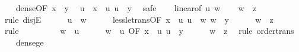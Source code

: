 \begin{isabellebody}
\ \ \isamarkupfalse%
\ dense{\isacharbrackleft}{\kern0pt}OF\ {\isacartoucheopen}x\ {\isacharless}{\kern0pt}\ y{\isacartoucheclose}{\isacharbrackright}{\kern0pt}\ \isamarkupfalse%
\ u\ \ {\isachardoublequoteopen}x\ {\isacharless}{\kern0pt}\ u{\isachardoublequoteclose}\ {\isachardoublequoteopen}u\ {\isacharless}{\kern0pt}\ y{\isachardoublequoteclose}\ \isamarkupfalse%
\ safe\isanewline
\ \ \isamarkupfalse%
\ linear{\isacharbrackleft}{\kern0pt}of\ u\ w{\isacharbrackright}{\kern0pt}\isanewline
\ \ \isamarkupfalse%
\ {\isachardoublequoteopen}w\ {\isasymle}\ z{\isachardoublequoteclose}\isanewline
\ \ \isamarkupfalse%
\ {\isacharparenleft}{\kern0pt}rule\ disjE{\isacharparenright}{\kern0pt}\isanewline
\ \ \ \ \isamarkupfalse%
\ {\isachardoublequoteopen}u\ {\isasymle}\ w{\isachardoublequoteclose}\isanewline
\ \ \ \ \isamarkupfalse%
\ less{\isacharunderscore}{\kern0pt}le{\isacharunderscore}{\kern0pt}trans{\isacharbrackleft}{\kern0pt}OF\ {\isacartoucheopen}x\ {\isacharless}{\kern0pt}\ u{\isacartoucheclose}\ {\isacartoucheopen}u\ {\isasymle}\ w{\isacartoucheclose}{\isacharbrackright}{\kern0pt}\ {\isacartoucheopen}w\ {\isacharless}{\kern0pt}\ y{\isacartoucheclose}\isanewline
\ \ \ \ \isamarkupfalse%
\ {\isachardoublequoteopen}w\ {\isasymle}\ z{\isachardoublequoteclose}\ \isamarkupfalse%
\ {\isacharparenleft}{\kern0pt}rule\ {\isacharasterisk}{\kern0pt}{\isacharparenright}{\kern0pt}\isanewline
\ \ \isamarkupfalse%
\isanewline
\ \ \ \ \isamarkupfalse%
\ {\isachardoublequoteopen}w\ {\isasymle}\ u{\isachardoublequoteclose}\isanewline
\ \ \ \ \isamarkupfalse%
\ {\isacartoucheopen}w\ {\isasymle}\ u{\isacartoucheclose}\ {\isacharasterisk}{\kern0pt}{\isacharbrackleft}{\kern0pt}OF\ {\isacartoucheopen}x\ {\isacharless}{\kern0pt}\ u{\isacartoucheclose}\ {\isacartoucheopen}u\ {\isacharless}{\kern0pt}\ y{\isacartoucheclose}{\isacharbrackright}{\kern0pt}\isanewline
\ \ \ \ \isamarkupfalse%
\ {\isachardoublequoteopen}w\ {\isasymle}\ z{\isachardoublequoteclose}\ \isamarkupfalse%
\ {\isacharparenleft}{\kern0pt}rule\ order{\isacharunderscore}{\kern0pt}trans{\isacharparenright}{\kern0pt}\isanewline
\ \ \isamarkupfalse%
\isanewline
{}\isamarkupfalse%
%
\endisatagproof
{\isafoldproof}%
%
\isadelimproof
\isanewline
%
\endisadelimproof
\isanewline
{}\isamarkupfalse%
\ dense{\isacharunderscore}{\kern0pt}ge{\isacharcolon}{\kern0pt}\isanewline

\end{isabellebody}
